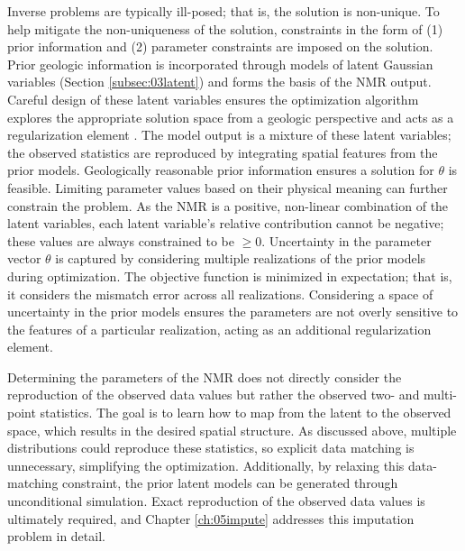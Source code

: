 Inverse problems are typically ill-posed; that is, the solution is non-unique. To help mitigate the non-uniqueness of the solution, constraints in the form of (1) prior information and (2) parameter constraints are imposed on the solution. Prior geologic information is incorporated through models of latent Gaussian variables (Section \ref{subsec:03latent}) and forms the basis of the \gls{NMR} output. Careful design of these latent variables ensures the optimization algorithm explores the appropriate solution space from a geologic perspective and acts as a regularization element \citep{zhou2014inverse}. The model output is a mixture of these latent variables; the observed statistics are reproduced by integrating spatial features from the prior models. Geologically reasonable prior information ensures a solution for $\theta$ is feasible. Limiting parameter values based on their physical meaning can further constrain the problem. As the \gls{NMR} is a positive, non-linear combination of the latent variables, each latent variable's relative contribution cannot be negative; these values are always constrained to be $\geq 0$. Uncertainty in the parameter vector $\theta$ is captured by considering multiple realizations of the prior models during optimization. The objective function is minimized in expectation; that is, it considers the mismatch error across all realizations. Considering a space of uncertainty in the prior models ensures the parameters are not overly sensitive to the features of a particular realization, acting as an additional regularization element.

Determining the parameters of the \gls{NMR} does not directly consider the reproduction of the observed data values but rather the observed two- and multi-point statistics. The goal is to learn how to map from the latent to the observed space, which results in the desired spatial structure. As discussed above, multiple distributions could reproduce these statistics, so explicit data matching is unnecessary, simplifying the optimization. Additionally, by relaxing this data-matching constraint, the prior latent models can be generated through unconditional simulation. Exact reproduction of the observed data values is ultimately required, and Chapter \ref{ch:05impute} addresses this imputation problem in detail.


